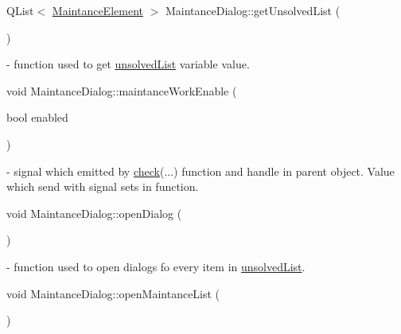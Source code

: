 \mbox{\label{classMaintanceDialog_af304179c775853116b308ed635f8d027}} 
{\footnotesize\ttfamily Q\+List$<$ \mbox{\hyperlink{classMaintanceElement}{Maintance\+Element}} $>$ Maintance\+Dialog\+::\texorpdfstring{get\+Unsolved\+List}{getUnsolvedList} (\begin{DoxyParamCaption}{ }\end{DoxyParamCaption})} - function used to get \hyperlink{classMaintanceDialog_a37e3caf05435d01f47ed488c39a91587}{unsolved\+List} variable value.

\mbox{\label{classMaintanceDialog_ada9e582be087bce2dd96a2629f2a417f}} 
{\footnotesize\ttfamily void Maintance\+Dialog\+::\texorpdfstring{maintance\+Work\+Enable}{maintanceWorkEnable} (\begin{DoxyParamCaption}\item[{bool}]{enabled }\end{DoxyParamCaption})\hspace{0.3cm}{\ttfamily [signal]}} - signal which emitted by \hyperlink{classMaintanceDialog_a0eb162bfea71b4712de3cc63cc6bb0f5}{check}(...) function and handle in parent object. Value which send with signal sets in function.

\mbox{\label{classMaintanceDialog_a9abf5dd5b908282f9f81f266708dd456}} 
{\footnotesize\ttfamily void Maintance\+Dialog\+::\texorpdfstring{open\+Dialog}{openDialog} (\begin{DoxyParamCaption}{ }\end{DoxyParamCaption})\hspace{0.3cm}{\ttfamily [slot]}} - function used to open dialogs fo every item in \hyperlink{classMaintanceDialog_a37e3caf05435d01f47ed488c39a91587}{unsolved\+List}.

\mbox{\label{classMaintanceDialog_ab97eb55c76459c27bc3ccf5c6a515b1e}} 
{\footnotesize\ttfamily void Maintance\+Dialog\+::\texorpdfstring{open\+Maintance\+List}{openMaintanceList} (\begin{DoxyParamCaption}{ }\end{DoxyParamCaption})\hspace{0.3cm}{\ttfamily [slot]}}

